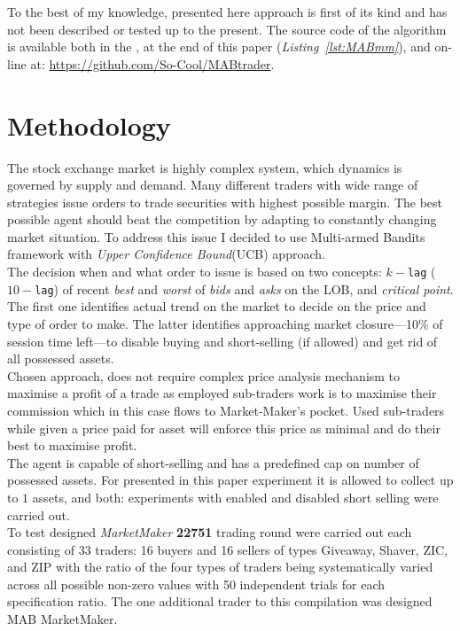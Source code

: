 \documentclass{llncs}
\begin{document}
To the best of my knowledge, presented here approach is first of its kind and has not been described or tested up to the present. The source code of the algorithm is available both in the \emph{\appendixname}, at the end of this paper (\emph{Listing~\ref{lst:MABmm}}), and on-line at: \url{https://github.com/So-Cool/MABtrader}.\\

\section{Methodology}
The stock exchange market is highly complex system, which dynamics is governed by supply and demand. Many different traders with wide range of strategies issue orders to trade securities with highest possible margin. The best possible agent should beat the competition by adapting to constantly changing market situation. To address this issue I decided to use Multi-armed Bandits framework with \emph{Upper Confidence Bound}(UCB) approach.\\

The decision when and what order to issue is based on two concepts: $k-$\texttt{lag} ($10-$\texttt{lag}) of recent \emph{best} and \emph{worst} of \emph{bids} and \emph{asks} on the LOB, and \emph{critical point}. The first one identifies actual trend on the market to decide on the price and type of order to make. The latter identifies approaching market closure---10\% of session time left---to disable buying and short-selling (if allowed) and get rid of all possessed assets.\\
Chosen approach, does not require complex price analysis mechanism to maximise a profit of a trade as employed sub-traders work is to maximise their commission which in this case flows to Market-Maker's pocket. Used sub-traders while given a price paid for asset will enforce this price as minimal and do their best to maximise profit.\\
The agent is capable of short-selling and has a predefined cap on number of possessed assets. For presented in this paper experiment it is allowed to collect up to $1$ assets, and both: experiments with enabled and disabled short selling were carried out.\\

To test designed \emph{MarketMaker} \textbf{22751} trading round were carried out each consisting of 33 traders: 16 buyers and 16 sellers of types Giveaway, Shaver, ZIC, and ZIP with the ratio of the four types of traders being systematically varied across all possible non-zero values with 50 independent trials for each specification ratio. The one additional trader to this compilation was designed MAB MarketMaker.
\end{document}
